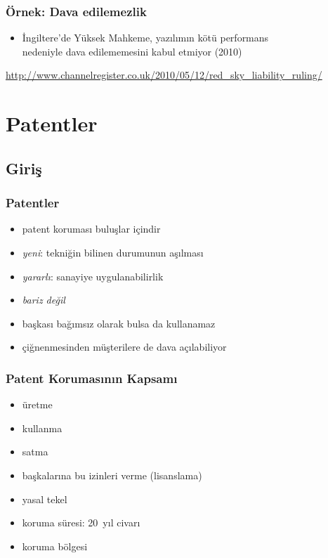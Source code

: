 \documentclass[dvipsnames]{beamer}
\theoremstyle{plain}
\begin{document}
\begin{frame}
  \frametitle{Örnek: Dava edilemezlik}

  \begin{center}
  \end{center}

  \begin{itemize}
    \item İngiltere'de Yüksek Mahkeme, yazılımın kötü performans\\
      nedeniyle dava edilememesini kabul etmiyor (2010)
  \end{itemize}

  \medskip
  \tiny{\url{http://www.channelregister.co.uk/2010/05/12/red_sky_liability_ruling/}}\\
\end{frame}

\section{Patentler}

\subsection{Giriş}

\begin{frame}
  \frametitle{Patentler}

  \begin{itemize}
    \item patent koruması \alert{buluşlar} içindir

    \medskip
    \item \emph{yeni}: tekniğin bilinen durumunun aşılması
    \item \emph{yararlı}: sanayiye uygulanabilirlik
    \item \emph{bariz değil}

    \pause
    \medskip
    \item başkası bağımsız olarak bulsa da kullanamaz
    \item çiğnenmesinden müşterilere de dava açılabiliyor
  \end{itemize}
\end{frame}

\begin{frame}
  \frametitle{Patent Korumasının Kapsamı}

  \begin{itemize}
    \item üretme
    \item kullanma
    \item satma
    \item başkalarına bu izinleri verme (lisanslama)
    \item \alert{yasal tekel}

    \pause
    \medskip
    \item koruma süresi: 20~yıl civarı
    \item koruma bölgesi
  \end{itemize}
\end{frame}
\end{document}
